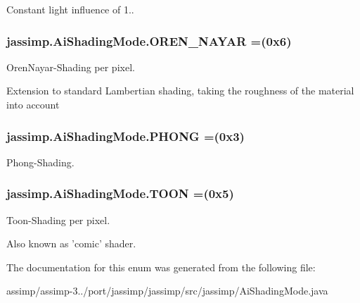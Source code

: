 Constant light influence of 1.. \hypertarget{enumjassimp_1_1_ai_shading_mode_ad9a2b7cbd9fc644782551062815fad7e}{
\subsubsection[{O\+R\+E\+N\+\_\+\+N\+A\+Y\+A\+R}]{\setlength{\rightskip}{0pt plus 5cm}jassimp.\+Ai\+Shading\+Mode.\+O\+R\+E\+N\+\_\+\+N\+A\+Y\+A\+R =(0x6)}}\label{enumjassimp_1_1_ai_shading_mode_ad9a2b7cbd9fc644782551062815fad7e}
Oren\+Nayar-\/\+Shading per pixel.

Extension to standard Lambertian shading, taking the roughness of the material into account \hypertarget{enumjassimp_1_1_ai_shading_mode_a6dff07927df6755a2af66641ae2c2913}{
\subsubsection[{P\+H\+O\+N\+G}]{\setlength{\rightskip}{0pt plus 5cm}jassimp.\+Ai\+Shading\+Mode.\+P\+H\+O\+N\+G =(0x3)}}\label{enumjassimp_1_1_ai_shading_mode_a6dff07927df6755a2af66641ae2c2913}
Phong-\/\+Shading. \hypertarget{enumjassimp_1_1_ai_shading_mode_ae266d2080d878b1bbb1dbe1bd99359a3}{
\subsubsection[{T\+O\+O\+N}]{\setlength{\rightskip}{0pt plus 5cm}jassimp.\+Ai\+Shading\+Mode.\+T\+O\+O\+N =(0x5)}}\label{enumjassimp_1_1_ai_shading_mode_ae266d2080d878b1bbb1dbe1bd99359a3}
Toon-\/\+Shading per pixel.

Also known as 'comic' shader. 

The documentation for this enum was generated from the following file\+:\begin{DoxyCompactItemize}
\item 
assimp/assimp-\/3../port/jassimp/jassimp/src/jassimp/Ai\+Shading\+Mode.\+java\end{DoxyCompactItemize}
